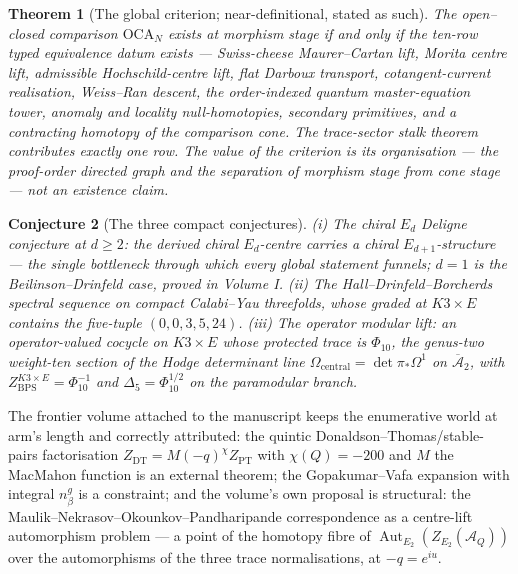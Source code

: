 \documentclass[11pt]{article}
\providecommand{\cA}{\mathcal{A}}
\providecommand{\Dfive}{\Delta_5}
\providecommand{\Phiten}{\Phi_{10}}
\newtheorem{theorem}{Theorem}[section]
\newtheorem{conjecture}[theorem]{Conjecture}
\begin{document}
\begin{theorem}[The global criterion; near-definitional, stated as
such]\label{thm:global}
The open--closed comparison $\mathrm{OCA}_N$ exists at morphism stage
if and only if the ten-row typed equivalence datum exists ---
Swiss-cheese Maurer--Cartan lift, Morita centre lift, admissible
Hochschild-centre lift, flat Darboux transport, cotangent-current
realisation, Weiss--Ran descent, the order-indexed quantum
master-equation tower, anomaly and locality null-homotopies, secondary
primitives, and a contracting homotopy of the comparison cone. The
trace-sector stalk theorem contributes exactly one row. The value of
the criterion is its organisation --- the proof-order directed graph
and the separation of morphism stage from cone stage --- not an
existence claim.
\end{theorem}

\begin{conjecture}[The three compact conjectures]\label{conj:three}
\textup{(i)} The chiral $E_d$ Deligne conjecture at $d\ge2$: the
derived chiral $E_d$-centre carries a chiral $E_{d+1}$-structure ---
the single bottleneck through which every global statement funnels;
$d=1$ is the Beilinson--Drinfeld case, proved in Volume I.
\textup{(ii)} The Hall--Drinfeld--Borcherds spectral sequence on
compact Calabi--Yau threefolds, whose graded at $K3\times E$ contains
the five-tuple $(0,0,3,5,24)$. \textup{(iii)} The operator modular
lift: an operator-valued cocycle on $K3\times E$ whose protected trace
is $\Phiten$, the genus-two weight-ten section of the Hodge
determinant line $\Omega_{\mathrm{central}}
=\det\pi_*\Omega^1$ on $\overline{\mathcal A}_2$, with
$Z^{K3\times E}_{\mathrm{BPS}}=\Phiten^{-1}$ and
$\Dfive=\Phiten^{1/2}$ on the paramodular branch.
\end{conjecture}

The frontier volume attached to the manuscript keeps the enumerative
world at arm's length and correctly attributed: the quintic
Donaldson--Thomas/stable-pairs factorisation
$Z_{\mathrm{DT}}=M(-q)^{\chi}Z_{\mathrm{PT}}$ with
$\chi(Q)=-200$ and $M$ the MacMahon function is an external theorem;
the Gopakumar--Vafa expansion with integral $n^g_\beta$ is a
constraint; and the volume's own proposal is structural: the
Maulik--Nekrasov--Okounkov--Pandharipande correspondence as a
centre-lift automorphism problem --- a point of the homotopy fibre of
$\operatorname{Aut}_{E_2}(Z_{E_2}(\cA_Q))$ over the automorphisms of
the three trace normalisations, at $-q=e^{iu}$.
\end{document}
